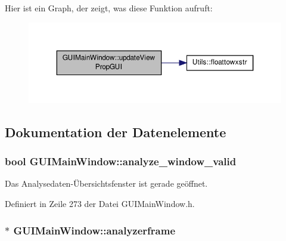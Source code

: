 Hier ist ein Graph, der zeigt, was diese Funktion aufruft\-:
\nopagebreak
\begin{figure}[H]
\begin{center}
\leavevmode
\includegraphics[width=350pt]{classGUIMainWindow_a2af54fc375be6b0fb938b8562980e723_cgraph}
\end{center}
\end{figure}




\subsection{Dokumentation der Datenelemente}
\hypertarget{classGUIMainWindow_a1f65a053fadac47033fef38c4b0e8a69}{
\subsubsection[{analyze\-\_\-window\-\_\-valid}]{\setlength{\rightskip}{0pt plus 5cm}bool G\-U\-I\-Main\-Window\-::analyze\-\_\-window\-\_\-valid\hspace{0.3cm}{\ttfamily [private]}}}\label{classGUIMainWindow_a1f65a053fadac47033fef38c4b0e8a69}


Das Analysedaten-\/Übersichtsfenster ist gerade geöffnet. 



Definiert in Zeile 273 der Datei G\-U\-I\-Main\-Window.\-h.

\hypertarget{classGUIMainWindow_a20e7a8cf498df1c1c0059711b487837b}{
\subsubsection[{analyzerframe}]{$\ast$ G\-U\-I\-Main\-Window\-::analyzerframe\hspace{0.3cm}{\ttfamily [private]}}}\label{classGUIMainWindow_a20e7a8cf498df1c1c0059711b487837b}


